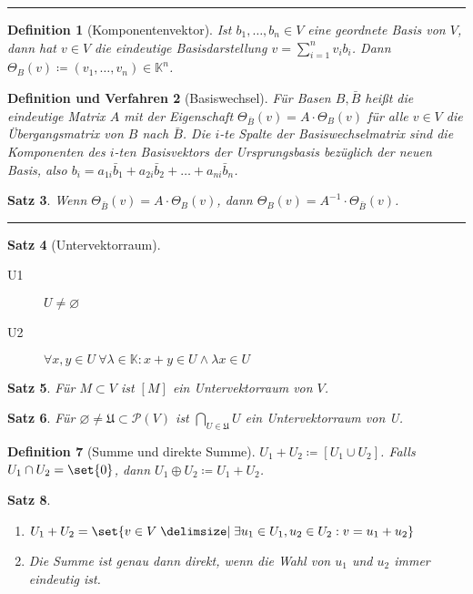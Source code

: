 \documentclass[a4paper]{article}
\newcounter{Sec}
\theoremstyle{marginbreak}
\newtheorem{definition}{Definition}[Sec]
\newtheorem{satz}[definition]{Satz}
\newtheorem{defver}[definition]{Definition und Verfahren}
\newcommand{\sep}{%
	\rule{\textwidth}{0.3pt}%
	\stepcounter{Sec}%
	}
\begin{document}
	\sep
	\begin{definition}[Komponentenvektor]
		Ist $b_1, \ldots, b_n \in V$ eine geordnete Basis von $V$, dann hat $v \in V$ die
		eindeutige Basisdarstellung $v = \sum_{i = 1}^nv_ib_i$. Dann
		$\Theta_B(v) \coloneqq (v_1,\ldots,v_n) \in \mathbb{K}^n$.
	\end{definition}
	\begin{defver}[Basiswechsel]
		Für Basen $B, \bar{B}$ heißt die eindeutige Matrix $A$ mit der Eigenschaft
		$\Theta_{\bar{B}}(v) = A\cdot\Theta_B(v)$ für alle $v \in V$ die Übergangsmatrix von
		$B$ nach $\bar{B}$. Die $i$-te Spalte der Basiswechselmatrix sind die Komponenten
		des $i$-ten Basisvektors der Ursprungsbasis bezüglich der neuen Basis, also
		$b_i = a_{1i}\bar{b}_1 + a_{2i}\bar{b}_2 + \ldots + a_{ni}\bar{b}_n$.
	\end{defver}
	\begin{satz}
		Wenn $\Theta_{\bar{B}}(v) = A\cdot\Theta_B(v)$, dann
		$\Theta_B(v) = A^{-1}\cdot\Theta_{\bar{B}}(v)$.
	\end{satz}
	\sep
	\begin{satz}[Untervektorraum]
		\begin{description}
			\item[U1] $U\neq\varnothing$
			\item[U2] $\forall x, y \in U~\forall \lambda\in\mathbb{K}: x + y \in U \wedge \lambda x\in U$
		\end{description}
	\end{satz}
	\begin{satz}
		Für $M \subset V$ ist $[M]$ ein Untervektorraum von $V$.
	\end{satz}
	\begin{satz}
		Für $\varnothing\neq\mathfrak{U}\subset\mathcal{P}(V)$ ist $\bigcap_{U\in\mathfrak{U}}U$
		ein Untervektorraum von U.
	\end{satz}
	\begin{definition}[Summe und direkte Summe]
		$U_1 + U_2 \coloneqq [U_1 \cup U_2]$. Falls $U_1 \cap U_2 = \set{0}$, dann
		$U_1 \oplus U_2 \coloneqq U_1 + U_2$.
	\end{definition}
	\begin{satz}
		\begin{enumerate}[label=(\alph*)]
			\item $U_1 + U_2 = \set{v \in V \given \exists u_1 \in U_1, u_2 \in U_2: v = u_1 + u_2}$
			\item Die Summe ist genau dann direkt, wenn die Wahl von $u_1$ und $u_2$ immer eindeutig ist.
		\end{enumerate}
	\end{satz}
\end{document}
